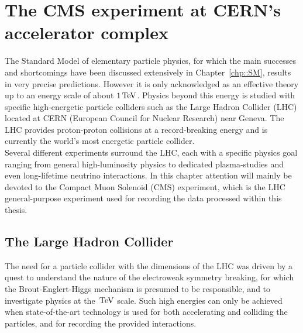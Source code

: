 \chapter{The CMS experiment at CERN's accelerator complex} \label{chp:CERN}

The Standard Model of elementary particle physics, for which the main successes and shortcomings have been discussed extensively in Chapter~\ref{chp::SM}, results in very precise predictions. However it is only acknowledged as an effective theory up to an energy scale of about $1 \, \mathrm{TeV}$. Physics beyond this energy is studied with specific high-energetic particle colliders such as the Large Hadron Collider (LHC) located at CERN (European Council for Nuclear Research) near Geneva. The LHC provides proton-proton collisions at a record-breaking energy and is currently the world's most energetic particle collider.\\
Several different experiments surround the LHC, each with a specific physics goal ranging from general high-luminosity physics to dedicated plasma-studies and even long-lifetime neutrino interactions.
In this chapter attention will mainly be devoted to the Compact Muon Solenoid (CMS) experiment, which is the LHC general-purpose experiment used for recording the data processed within this thesis.

\section{The Large Hadron Collider}
The need for a particle collider with the dimensions of the LHC was driven by a quest to understand the nature of the electroweak symmetry breaking, for which the Brout-Englert-Higgs mechanism is presumed to be responsible, and to investigate physics at the $\, \mathrm{TeV}$ scale.
Such high energies can only be achieved when state-of-the-art technology is used for both accelerating and colliding the particles, and for recording the provided interactions.
\\

